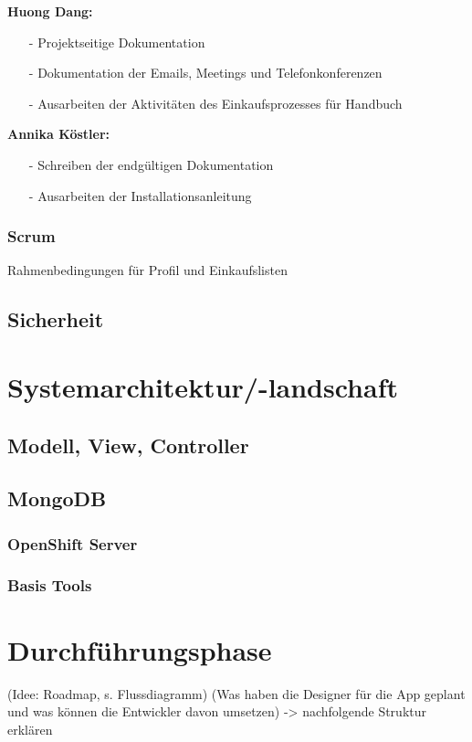 \documentclass[12pt,a4paper]{article}
\begin{document}
\textbf{Huong Dang:}
\begin{itemize}
\item[-] Projektseitige Dokumentation
\item[-] Dokumentation der Emails, Meetings und Telefonkonferenzen
\item[-] Ausarbeiten der Aktivitäten des Einkaufsprozesses für Handbuch 
\end{itemize}

\textbf{Annika Köstler:}
\begin{itemize}
\item[-] Schreiben der endgültigen Dokumentation
\item[-] Ausarbeiten der Installationsanleitung 
\end{itemize}
\newpage

\subsubsection{Scrum}
Rahmenbedingungen für Profil und Einkaufslisten
\newpage
\subsection{Sicherheit}
\newpage


\section{Systemarchitektur/-landschaft}
\newpage
\subsection{Modell, View, Controller}
\newpage
\subsection{MongoDB}
\newpage
\subsubsection{OpenShift Server}
\newpage
\subsubsection{Basis Tools}
\newpage

\section{Durchführungsphase}
(Idee: Roadmap, s. Flussdiagramm) (Was haben die Designer für die App geplant und was können die Entwickler davon umsetzen) -> nachfolgende Struktur erklären
\end{document}
